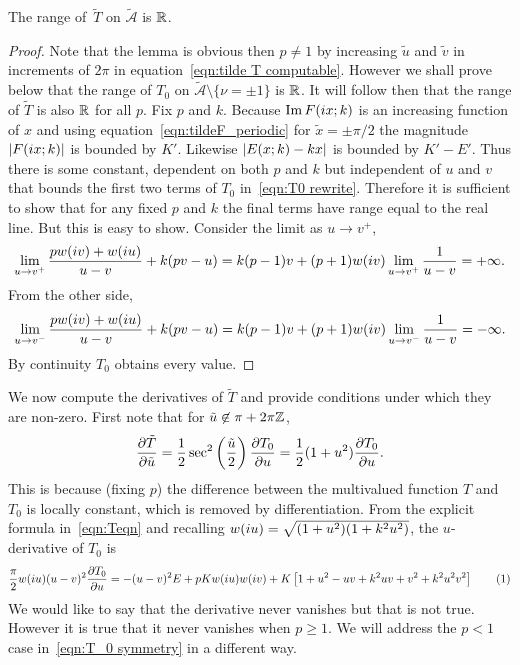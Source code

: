 \documentclass{article}
\begin{document}
\begin{lem}\label{lem:range_T}
The range of \,$\tilde{T}$ on $\mathcal{\tilde{A}}$ is $\mathbb{R}$.

\begin{proof}
Note that the lemma is obvious then $p\neq 1$ by increasing $\tilde{u}$ and $\tilde{v}$ in increments of $2\pi$ in equation~\ref{eqn:tilde T computable}. However we shall prove below that the range of $T_0$ on $\mathcal{\tilde{A}} \setminus \{\nu = \pm 1\}$ is $\mathbb{R}$. It will follow then that the range of $\tilde{T}$ is also $\mathbb{R}$ for all $p$. Fix $p$ and $k$. Because $\operatorname{Im} F(i x;k)$ is an increasing function of $x$ and using equation~\ref{eqn:tildeF_periodic} for $\tilde{x}=\pm\pi/2$ the magnitude $\left|F(i x;k)\right|$ is bounded by $K'$. Likewise $\left|E(x;k) - kx\right|$ is bounded by $K'-E'$. Thus there is some constant, dependent on both $p$ and $k$ but independent of $u$ and $v$ that bounds the first two terms of $T_0$ in~\eqref{eqn:T0 rewrite}.
Therefore it is sufficient to show that for any fixed $p$ and $k$ the final terms have range equal to the real line. But this is easy to show. Consider the limit as $u \to v^+$,
\[
\lim_{u \to v^+} \frac{pw(i v) + w(i u)}{u-v} + k(pv-u)
= k(p-1)v + (p+1) w(i v)\lim_{u \to v^+} \frac{1}{u-v} = +\infty.
\]
From the other side,
\[
\lim_{u \to v^-} \frac{pw(i v) + w(i u)}{u-v} + k(pv-u)
= k(p-1)v + (p+1) w(i v)\lim_{u \to v^-} \frac{1}{u-v} = -\infty.
\]
By continuity $T_0$ obtains every value.
\end{proof}
\end{lem}


We now compute the derivatives of $\tilde{T}$ and provide conditions under which they are non-zero. First note that for $\tilde{u} \not\in \pi + 2\pi\mathbb{Z}$,
\[
\frac{\partial \tilde{T}}{\partial \tilde{u}} 
= \frac{1}{2}\sec^2\left(\frac{\tilde{u}}{2}\right) \frac{\partial T_0}{\partial u}
= \frac{1}{2}(1+u^2) \frac{\partial T_0}{\partial u}.
\] 
This is because (fixing $p$) the difference between the multivalued function $T$ and $T_0$ is locally constant, which is removed by differentiation.
From the explicit formula in~\eqref{eqn:Teqn} and recalling $w(i u) = \sqrt{(1+u^2)(1+k^2 u^2)}$, the $u$-derivative of $T_0$ is
\[
\frac{\pi}{2}w(\iu u)(u-v)^2\Partial{T_0}{u}
= -(u-v)^2 E + pKw(\iu u)w(\iu v) + K\left[ 1 + u^2 - uv + k^2 uv + v^2 + k^2 u^2 v^2 \right]
\labelthis{eqn:dTdu}
\]
We would like to say that the derivative never vanishes but that is not true. However it is true that it never vanishes when $p \geq 1$. We will address the $p < 1$ case in~\eqref{eqn:T_0 symmetry} in a different way.
\end{document}

